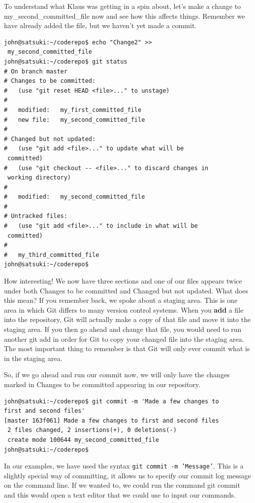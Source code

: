 To understand what Klaus was getting in a spin about, let's make a change to my\_second\_committed\_file now and see how this affects things.  Remember we have already added the file, but we haven't yet made a commit.

\begin{Verbatim}[frame=leftline,framerule=1mm,fontsize=\relsize{-3}] 
john@satsuki:~/coderepo$ echo "Change2" >> 
 my_second_committed_file 
john@satsuki:~/coderepo$ git status
# On branch master
# Changes to be committed:
#   (use "git reset HEAD <file>..." to unstage)
#
#	modified:   my_first_committed_file
#	new file:   my_second_committed_file
#
# Changed but not updated:
#   (use "git add <file>..." to update what will be 
 committed)
#   (use "git checkout -- <file>..." to discard changes in 
 working directory)
#
#	modified:   my_second_committed_file
#
# Untracked files:
#   (use "git add <file>..." to include in what will be 
 committed)
#
#	my_third_committed_file
john@satsuki:~/coderepo$ 
\end{Verbatim} 

How interesting!  We now have three sections and one of our files appears twice under both Changes to be committed and Changed but not updated.  What does this mean?  If you remember back, we spoke about a staging area.  This is one area in which Git differs to many version control systems.  When you \textbf{add} a file into the repository, Git will actually make a copy of that file and move it into the staging area.  If you then go ahead and change that file, you would need to run another git add in order for Git to copy your changed file into the staging area.  The most important thing to remember is that Git will only ever commit what is in the staging area.

So, if we go ahead and run our commit now, we will only have the changes marked in Changes to be committed appearing in our repository.  

\begin{Verbatim}[frame=leftline,framerule=1mm,fontsize=\relsize{-3}] 
john@satsuki:~/coderepo$ git commit -m 'Made a few changes to 
first and second files'
[master 163f061] Made a few changes to first and second files
 2 files changed, 2 insertions(+), 0 deletions(-)
 create mode 100644 my_second_committed_file
john@satsuki:~/coderepo$ 
\end{Verbatim} 

In our examples, we have used the syntax \texttt{git commit -m 'Message'}.  This is a slightly special way of committing, it allows us to specify our commit log message on the command line.  If we wanted to, we could run the command git commit and this would open a text editor that we could use to input our commands.

